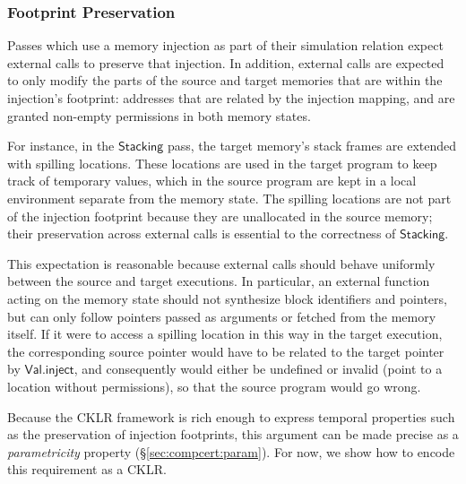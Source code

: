 \documentclass[acmsmall,timestamp,review,anonymous]{acmart}
\newcommand{\kw}[1]{\ensuremath{ \mathsf{#1} }}
\begin{document}

\subsubsection{Footprint Preservation} %

Passes which use a memory injection as part of their simulation relation
expect external calls to preserve that injection.
In addition,
external calls are expected to only modify
the parts of the source and target memories
that are within the injection's footprint:
addresses that are
related by the injection mapping,
and are granted non-empty permissions
in both memory states.

For instance,
in the \kw{Stacking} pass,
the target memory's stack frames
are extended with spilling locations.
These locations are used in the target program
to keep track of temporary values,
which in the source program are kept
in a local environment separate from the memory state.
The spilling locations are not part of
the injection footprint
because they are unallocated in the source memory;
their preservation across external calls
is essential to the correctness of \kw{Stacking}.

This expectation is reasonable because
external calls
should behave uniformly between the source and target executions.
In particular,
an external function acting on the memory state
should not synthesize block identifiers and pointers,
but can only follow pointers passed as arguments
or fetched from the memory itself.
If it were to access a spilling location in this way in the target execution,
the corresponding source pointer would have to be
related to the target pointer by \kw{Val.inject},
and consequently would either be undefined
or invalid (point to a location without permissions),
so that the source program would go wrong.

Because the CKLR framework is rich enough to express
temporal properties such as the preservation of injection footprints,
this argument can be made precise as a \emph{parametricity} property
(\S\ref{sec:compcert:param}).
For now,
we show how to encode this requirement as a CKLR.
\end{document}
